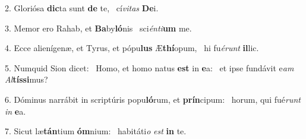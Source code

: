 2. Gloriósa \textbf{dic}ta sunt \textbf{de} te, \ast\  cí\textit{vi}\textit{tas} \textbf{De}i.\

3. Memor ero Rahab, et \textbf{Ba}by\textbf{ló}nis \ast\  sci\textit{én}\textit{ti}\textbf{um} me.\

4. Ecce alienígenæ, et Tyrus, et pópu\textbf{lus} Æ\textbf{thí}opum, \ast\  hi fu\textit{é}\textit{runt} \textbf{il}lic.\

5. Numquid Sion dicet: \dag\  Homo, et homo natus \textbf{est} in \textbf{e}a: \ast\  et ipse fundávit e\textit{am} \textit{Al}\textbf{tís}\textbf{si}mus?\

6. Dóminus narrábit in scriptúris popu\textbf{ló}rum, et \textbf{prín}cipum: \ast\  horum, qui fué\textit{runt} \textit{in} \textbf{e}a.\

7. Sicut læ\textbf{tán}tium \textbf{óm}nium: \ast\  habitáti\textit{o} \textit{est} \textbf{in} te.\


